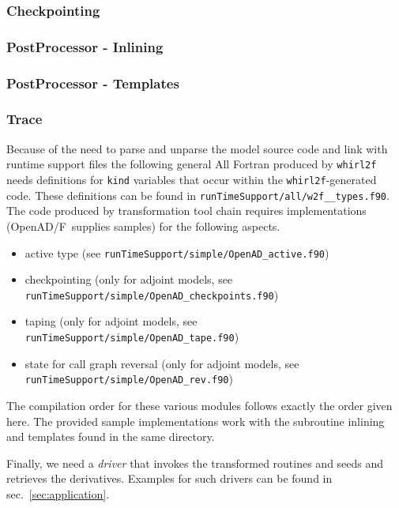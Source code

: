 \documentclass{book}
\newcommand{\OpenADF}{OpenAD/F}
\newcommand{\refsec}[1]{{sec.~\ref{#1}}}
\begin{document}
\subsubsection{Checkpointing}

\subsubsection{PostProcessor - Inlining}

\subsubsection{PostProcessor - Templates}

\subsubsection{Trace}

Because of the need to parse and unparse the model source code and link 
with runtime support files the following general 
All Fortran produced by \lstinline{whirl2f} needs definitions for \lstinline{kind} 
variables that occur within the \lstinline{whirl2f}-generated code. 
These definitions can be found in \lstinline{runTimeSupport/all/w2f__types.f90}.
The code produced by  transformation tool chain 
requires  implementations 
(\OpenADF\ supplies samples) for the following aspects.
\begin{itemize}
\item active type (see \lstinline{runTimeSupport/simple/OpenAD_active.f90})
\item checkpointing (only  for adjoint models, see \lstinline{runTimeSupport/simple/OpenAD_checkpoints.f90})  
\item taping (only  for adjoint models, see \lstinline{runTimeSupport/simple/OpenAD_tape.f90})  
\item state for call graph reversal (only  for adjoint models, see \lstinline{runTimeSupport/simple/OpenAD_rev.f90})
\end{itemize}
The compilation order for these various modules follows exactly the order given here.
The provided sample implementations work with the subroutine inlining and templates found in the same 
directory.

Finally, we need a {\em driver} that invokes the transformed routines and seeds and retrieves the derivatives.
Examples for such drivers can be found in \refsec{sec:application}.

\end{document}
